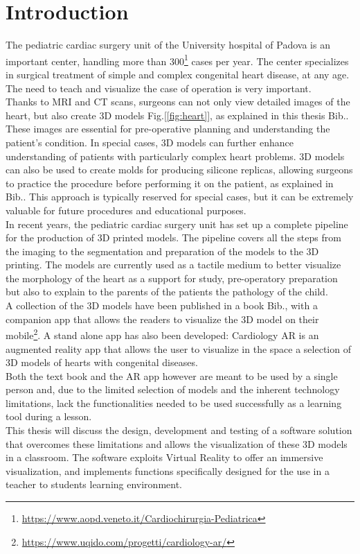 
\chapter{Introduction}
\label{chp:intro}
\noindent
The pediatric cardiac surgery unit of the University hospital of Padova is an important center, handling more than 300\footnote{\url{https://www.aopd.veneto.it/Cardiochirurgia-Pediatrica}} cases per year. The center specializes in surgical treatment of simple and complex congenital heart disease, at any age.
The need to teach and visualize the case of operation is very important. \\
Thanks to \ac{MRI} and \ac{CT} scans, surgeons can not only view detailed images of the heart, but also create 3D models Fig.[\ref{fig:heart}], as explained in this thesis Bib.\cite{thesisFrancesco}. These images are essential for pre-operative planning and understanding the patient's condition.
In special cases, 3D models can further enhance understanding of patients with particularly complex heart problems.
3D models can also be used to create molds for producing silicone replicas, allowing surgeons to practice the procedure before performing it on the patient, as explained in Bib.\cite{thesisFabio}.
This approach is typically reserved for special cases, but it can be extremely valuable for future procedures and educational purposes.\\
In recent years, the pediatric cardiac surgery unit has set up a complete pipeline for the production of 3D printed models.
The pipeline covers all the steps from the imaging to the segmentation and preparation of the models to the 3D printing.
The models are currently used as a tactile medium to better visualize the morphology of the heart as a support for study, pre-operatory preparation but also to explain to the parents of the patients the pathology of the child.\\
A collection of the 3D models have been published in a book Bib.\cite{book}, with a companion app that allows the readers to visualize the 3D model on their mobile\footnote{\url{https://www.uqido.com/progetti/cardiology-ar/}}.
A stand alone app has also been developed: Cardiology AR is an augmented reality app that allows the user to visualize in the space a selection of 3D models of hearts with congenital diseases.\\
Both the text book and the AR app however are meant to be used by a single person and, due to the limited selection of models and the inherent technology limitations, lack the functionalities needed to be used successfully as a learning tool during a lesson.\\
This thesis will discuss the design, development and testing of a software solution that overcomes these limitations and allows the visualization of these 3D models in a classroom.
The software exploits Virtual Reality to offer an immersive visualization, and implements functions specifically designed for the use in a teacher to students learning environment.

